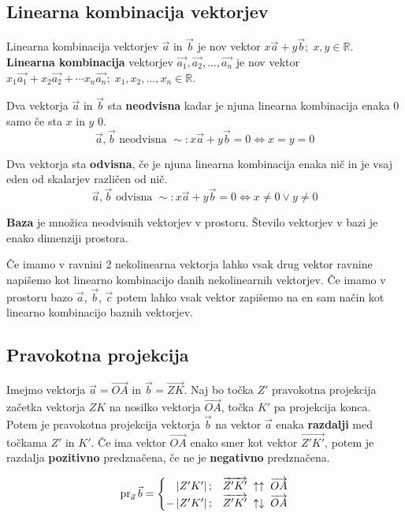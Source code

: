 \documentclass[a4paper,oneside,12pt,fleqn]{article}
\def\R{\ensuremath{\mathbb R}}
\newcommand{\pr}{\ensuremath{\operatorname{pr}}} %
\def\Vec{\overrightarrow}
\renewcommand\iff\Leftrightarrow
\numberwithin{equation}{section}
\begin{document}
\subsection{Linearna kombinacija vektorjev}
\label{sec:vec:linkomb}
Linearna kombinacija vektorjev $\vec{a}$ in $\vec{b}$ je nov vektor $x\vec{a} + y\vec{b};
\; x,y \in \R$.
\textbf{Linearna kombinacija} vektorjev $\vec{a_1},\vec{a_2},\ldots,\vec{a_n}$ je nov vektor
$x_1\vec{a_1} + x_2\vec{a_2} + \cdots x_n\vec{a_n}; \; x_1,x_2,\ldots,x_n \in \R$.

Dva vektorja $\vec{a}$ in $\vec{b}$ sta \textbf{neodvisna} kadar je njuna linearna kombinacija
enaka 0 samo če sta $x$ in $y$ 0.
\[ \vec{a},  \vec{b} \text{ neodvisna } \sim: x\vec{a} + y\vec{b} = 0 \iff x = y = 0 \]

Dva vektorja sta \textbf{odvisna}, če je njuna linearna kombinacija enaka nič in je vsaj eden od
skalarjev različen od nič.
\[ \vec{a},  \vec{b} \text{ odvisna } \sim: x\vec{a} + y\vec{b} = 0 \iff x \neq 0 \lor y \neq 0 \]

\textbf{Baza} je množica neodvisnih vektorjev v prostoru. Število vektorjev v bazi je enako
dimenziji prostora.

Če imamo v ravnini 2 nekolinearna vektorja lahko vsak drug vektor ravnine napišemo kot
linearno kombinacijo danih nekolinearnih vektorjev.
Če imamo v prostoru bazo $\vec{a}$, $\vec{b}$, $\vec{c}$ potem lahko vsak vektor zapišemo na en
sam način kot linearno kombinacijo baznih vektorjev.

\subsection{Pravokotna projekcija}
\label{sec:vec:proj}
Imejmo vektorja $\vec{a} = \Vec{OA}$ in $\vec{b} = \Vec{ZK}$. Naj bo točka $Z'$ pravokotna
projekcija začetka vektorja $ZK$ na nosilko vektorja $\Vec{OA}$, točka $K'$ pa projekcija konca.
Potem je pravokotna projekcija vektorja $\vec{b}$ na vektor $\vec{a}$ enaka
\textbf{razdalji} med
točkama $Z'$ in $K'$. Če ima vektor $\Vec{OA}$ enako smer kot vektor $\Vec{Z'K'}$, potem
je razdalja \textbf{pozitivno} predznačena, če ne je \textbf{negativno} predznačena.

\[ \pr_{\vec{a}}\vec{b} =
\begin{cases}
  \hfill \left| Z'K' \right|; & \Vec{Z'K'} \;\uparrow\uparrow\; \Vec{OA} \\
  \hfill -\left| Z'K' \right|; & \Vec{Z'K'} \;\uparrow\downarrow\; \Vec{OA}
\end{cases} \]
\end{document}
